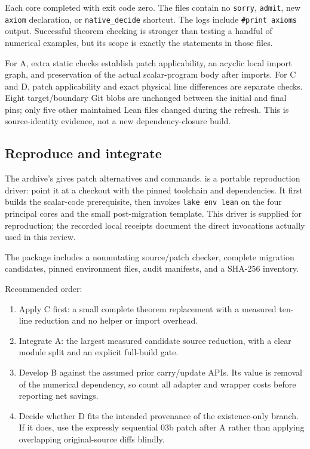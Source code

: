 \documentclass[11pt,a4paper]{article}
\newcommand{\code}[1]{\texttt{\small #1}}
\begin{document}
Each core completed with exit code zero. The files contain no \code{sorry}, \code{admit}, new \code{axiom} declaration, or \code{native\_decide} shortcut. The logs include \code{\#print axioms} output. Successful theorem checking is stronger than testing a handful of numerical examples, but its scope is exactly the statements in those files.

For A, extra static checks establish patch applicability, an acyclic local import graph, and preservation of the actual scalar-program body after imports. For C and D, patch applicability and exact physical line differences are separate checks. Eight target/boundary Git blobs are unchanged between the initial and final pins; only five other maintained Lean files changed during the refresh. This is source-identity evidence, not a new dependency-closure build.

\subsection{Reproduce and integrate}

The archive's  gives patch alternatives and commands.  is a portable reproduction driver: point it at a checkout with the pinned toolchain and dependencies. It first builds the scalar-code prerequisite, then invokes \code{lake env lean} on the four principal cores and the small post-migration template. This driver is supplied for reproduction; the recorded local receipts document the direct invocations actually used in this review.

The package includes a nonmutating source/patch checker, complete migration candidates, pinned environment files, audit manifests, and a SHA-256 inventory.

\newpage
Recommended order:
\begin{enumerate}
\item Apply C first: a small complete theorem replacement with a measured ten-line reduction and no helper or import overhead.
\item Integrate A: the largest measured candidate source reduction, with a clear module split and an explicit full-build gate.
\item Develop B against the assumed prior carry/update APIs. Its value is removal of the numerical dependency, so count all adapter and wrapper costs before reporting net savings.
\item Decide whether D fits the intended provenance of the existence-only branch. If it does, use the expressly sequential 03b patch after A rather than applying overlapping original-source diffs blindly.
\end{enumerate}
\end{document}
